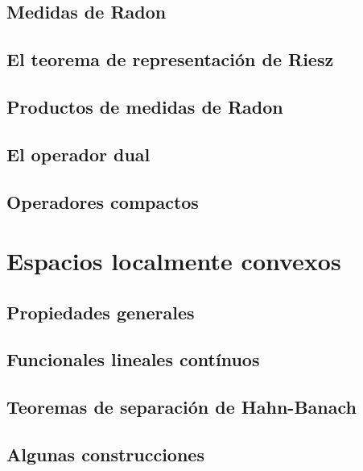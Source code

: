 \documentclass[12pt,]{krantz}
\theoremstyle{definition}
\theoremstyle{definition}
\theoremstyle{definition}
\theoremstyle{remark}
\begin{document}
\section{Medidas de Radon}\label{medidas-de-radon}

\section{El teorema de representación de
Riesz}\label{el-teorema-de-representacion-de-riesz}

\section{Productos de medidas de
Radon}\label{productos-de-medidas-de-radon}

\section{El operador dual}\label{el-operador-dual}

\section{Operadores compactos}\label{operadores-compactos}

\chapter{Espacios localmente
convexos}\label{espacios-localmente-convexos}

\section{Propiedades generales}\label{propiedades-generales-2}

\section{Funcionales lineales
contínuos}\label{funcionales-lineales-continuos}

\section{Teoremas de separación de
Hahn-Banach}\label{teoremas-de-separacion-de-hahn-banach}

\section{Algunas construcciones}\label{algunas-construcciones}
\end{document}
